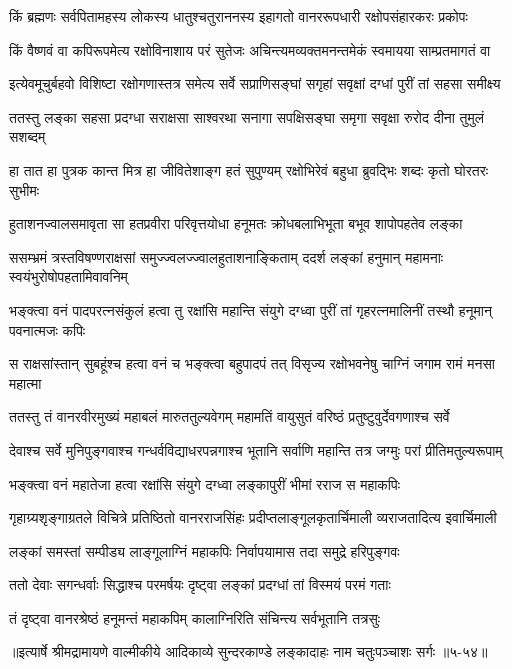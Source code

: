 \twolineshloka
{किं ब्रह्मणः सर्वपितामहस्य लोकस्य धातुश्चतुराननस्य}
{इहागतो वानररूपधारी रक्षोपसंहारकरः प्रकोपः} %

\twolineshloka
{किं वैष्णवं वा कपिरूपमेत्य रक्षोविनाशाय परं सुतेजः}
{अचिन्त्यमव्यक्तमनन्तमेकं स्वमायया साम्प्रतमागतं वा} %

\twolineshloka
{इत्येवमूचुर्बहवो विशिष्टा रक्षोगणास्तत्र समेत्य सर्वे}
{सप्राणिसङ्घां सगृहां सवृक्षां दग्धां पुरीं तां सहसा समीक्ष्य} %

\twolineshloka
{ततस्तु लङ्का सहसा प्रदग्धा सराक्षसा साश्वरथा सनागा}
{सपक्षिसङ्घा समृगा सवृक्षा रुरोद दीना तुमुलं सशब्दम्} %

\twolineshloka
{हा तात हा पुत्रक कान्त मित्र हा जीवितेशाङ्ग हतं सुपुण्यम्}
{रक्षोभिरेवं बहुधा ब्रुवद्भिः शब्दः कृतो घोरतरः सुभीमः} %

\twolineshloka
{हुताशनज्वालसमावृता सा हतप्रवीरा परिवृत्तयोधा}
{हनूमतः क्रोधबलाभिभूता बभूव शापोपहतेव लङ्का} %

\twolineshloka
{ससम्भ्रमं त्रस्तविषण्णराक्षसां समुज्ज्वलज्ज्वालहुताशनाङ्किताम्}
{ददर्श लङ्कां हनुमान् महामनाः स्वयंभुरोषोपहतामिवावनिम्} %

\twolineshloka
{भङ्क्त्वा वनं पादपरत्नसंकुलं हत्वा तु रक्षांसि महान्ति संयुगे}
{दग्ध्वा पुरीं तां गृहरत्नमालिनीं तस्थौ हनूमान् पवनात्मजः कपिः} %

\twolineshloka
{स राक्षसांस्तान् सुबहूंश्च हत्वा वनं च भङ्क्त्वा बहुपादपं तत्}
{विसृज्य रक्षोभवनेषु चाग्निं जगाम रामं मनसा महात्मा} %

\twolineshloka
{ततस्तु तं वानरवीरमुख्यं महाबलं मारुततुल्यवेगम्}
{महामतिं वायुसुतं वरिष्ठं प्रतुष्टुवुर्देवगणाश्च सर्वे} %

\twolineshloka
{देवाश्च सर्वे मुनिपुङ्गवाश्च गन्धर्वविद्याधरपन्नगाश्च}
{भूतानि सर्वाणि महान्ति तत्र जग्मुः परां प्रीतिमतुल्यरूपाम्} %

\twolineshloka
{भङ्क्त्वा वनं महातेजा हत्वा रक्षांसि संयुगे}
{दग्ध्वा लङ्कापुरीं भीमां रराज स महाकपिः} %

\twolineshloka
{गृहाग्र्यशृङ्गाग्रतले विचित्रे प्रतिष्ठितो वानरराजसिंहः}
{प्रदीप्तलाङ्गूलकृतार्चिमाली व्यराजतादित्य इवार्चिमाली} %

\twolineshloka
{लङ्कां समस्तां सम्पीड्य लाङ्गूलाग्निं महाकपिः}
{निर्वापयामास तदा समुद्रे हरिपुङ्गवः} %

\twolineshloka
{ततो देवाः सगन्धर्वाः सिद्धाश्च परमर्षयः}
{दृष्ट्वा लङ्कां प्रदग्धां तां विस्मयं परमं गताः} %

\twolineshloka
{तं दृष्ट्वा वानरश्रेष्ठं हनूमन्तं महाकपिम्}
{कालाग्निरिति संचिन्त्य सर्वभूतानि तत्रसुः} %


॥इत्यार्षे श्रीमद्रामायणे वाल्मीकीये आदिकाव्ये सुन्दरकाण्डे लङ्कादाहः नाम चतुःपञ्चाशः सर्गः ॥५-५४॥
